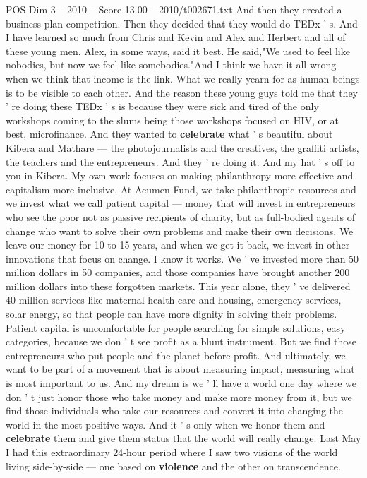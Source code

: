 \begin{textsample}{POS Dim 3 – 2010 – Score 13.00 – 2010/t002671.txt}
And then they created a business plan competition.
Then they decided that they would do TEDx ' s.
And I have learned so much from Chris and Kevin and Alex and Herbert and all of these young men.
Alex, in some ways, said it best.
He said,"We used to feel like nobodies, but now we feel like somebodies."And I think we have it all wrong when we think that income is the link.
What we really yearn for as human beings is to be visible to each other.
And the reason these young guys told me that they ' re doing these TEDx ' s is because they were sick and tired of the only workshops coming to the slums being those workshops focused on HIV, or at best, microfinance.
And they wanted to \textbf{celebrate} what ' s beautiful about Kibera and Mathare — the photojournalists and the creatives, the graffiti artists, the teachers and the entrepreneurs.
And they ' re doing it.
And my hat ' s off to you in Kibera.
My own work focuses on making philanthropy more effective and capitalism more inclusive.
At Acumen Fund, we take philanthropic resources and we invest what we call patient capital — money that will invest in entrepreneurs who see the poor not as passive recipients of charity, but as full-bodied agents of change who want to solve their own problems and make their own decisions.
We leave our money for 10 to 15 years, and when we get it back, we invest in other innovations that focus on change.
I know it works.
We ' ve invested more than 50 million dollars in 50 companies, and those companies have brought another 200 million dollars into these forgotten markets.
This year alone, they ' ve delivered 40 million services like maternal health care and housing, emergency services, solar energy, so that people can have more dignity in solving their problems.
Patient capital is uncomfortable for people searching for simple solutions, easy categories, because we don ' t see profit as a blunt instrument.
But we find those entrepreneurs who put people and the planet before profit.
And ultimately, we want to be part of a movement that is about measuring impact, measuring what is most important to us.
And my dream is we ' ll have a world one day where we don ' t just honor those who take money and make more money from it, but we find those individuals who take our resources and convert it into changing the world in the most positive ways.
And it ' s only when we honor them and \textbf{celebrate} them and give them status that the world will really change.
Last May I had this extraordinary 24-hour period where I saw two visions of the world living side-by-side — one based on \textbf{violence} and the other on transcendence.

\end{textsample}
